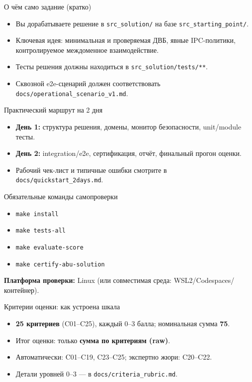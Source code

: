 \documentclass[aspectratio=169]{beamer}
\begin{document}
\begin{frame}{О чём само задание (кратко)}
  \begin{itemize}
    \item Вы дорабатываете решение в \texttt{src\_solution/} на базе \texttt{src\_starting\_point/}.
    \item Ключевая идея: минимальная и проверяемая ДВБ, явные IPC-политики, контролируемое междоменное взаимодействие.
    \item Тесты решения должны находиться в \texttt{src\_solution/tests/**}.
    \item Сквозной e2e-сценарий должен соответствовать \texttt{docs/operational\_scenario\_v1.md}.
  \end{itemize}
\end{frame}

\begin{frame}{Практический маршрут на 2 дня}
  \begin{itemize}
    \item \textbf{День 1:} структура решения, домены, монитор безопасности, unit/module тесты.
    \item \textbf{День 2:} integration/e2e, сертификация, отчёт, финальный прогон оценки.
    \item Рабочий чек-лист и типичные ошибки смотрите в \texttt{docs/quickstart\_2days.md}.
  \end{itemize}
\end{frame}

\begin{frame}{Обязательные команды самопроверки}
  \begin{itemize}
    \item \texttt{make install}
    \item \texttt{make tests-all}
    \item \texttt{make evaluate-score}
    \item \texttt{make certify-abu-solution}
  \end{itemize}
  \vspace{0.6em}
  \textbf{Платформа проверки:} Linux (или совместимая среда: WSL2/Codespaces/контейнер).
\end{frame}

\begin{frame}{Критерии оценки: как устроена шкала}
  \begin{itemize}
    \item \textbf{25 критериев} (C01--C25), каждый 0--3 балла; номинальная сумма \textbf{75}.
    \item Итог оценки: только \textbf{сумма по критериям (raw)}.
    \item Автоматически: C01--C19, C23--C25; экспертно жюри: C20--C22.
    \item Детали уровней 0--3 --- в \texttt{docs/criteria\_rubric.md}.
  \end{itemize}
\end{frame}
\end{document}
